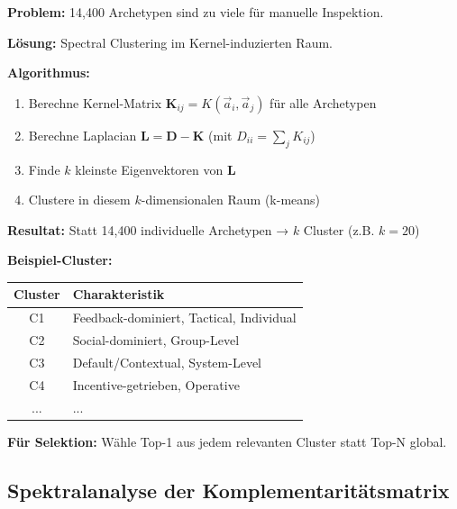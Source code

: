 \begin{tcolorbox}[colback=green!5!white, colframe=green!75!black,
    title=\textbf{Anwendung: Kernel-basiertes Clustering von Archetypen}]

\textbf{Problem:} 14,400 Archetypen sind zu viele für manuelle Inspektion.

\textbf{Lösung:} Spectral Clustering im Kernel-induzierten Raum.

\textbf{Algorithmus:}
\begin{enumerate}[nosep]
    \item Berechne Kernel-Matrix $\mathbf{K}_{ij} = K(\vec{a}_i, \vec{a}_j)$ für alle Archetypen
    \item Berechne Laplacian $\mathbf{L} = \mathbf{D} - \mathbf{K}$ (mit $D_{ii} = \sum_j K_{ij}$)
    \item Finde $k$ kleinste Eigenvektoren von $\mathbf{L}$
    \item Clustere in diesem $k$-dimensionalen Raum (k-means)
\end{enumerate}

\textbf{Resultat:} Statt 14,400 individuelle Archetypen → $k$ Cluster (z.B. $k = 20$)

\textbf{Beispiel-Cluster:}
\begin{center}
\begin{tabular}{@{}cl@{}}
\toprule
\textbf{Cluster} & \textbf{Charakteristik} \\
\midrule
C1 & Feedback-dominiert, Tactical, Individual \\
C2 & Social-dominiert, Group-Level \\
C3 & Default/Contextual, System-Level \\
C4 & Incentive-getrieben, Operative \\
... & ... \\
\bottomrule
\end{tabular}
\end{center}

\textbf{Für Selektion:} Wähle Top-1 aus jedem relevanten Cluster statt Top-N global.

\end{tcolorbox}

\subsection{Spektralanalyse der Komplementaritätsmatrix}

